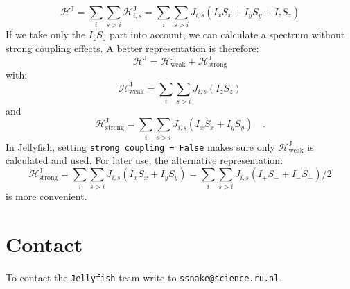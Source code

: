 \documentclass[11pt,a4paper]{article}
\begin{document}
\begin{equation}
  \mathcal{H}^\text{J} = \sum_{i}\sum_{s>i}{\mathcal{H}_{i,s}^\text{J}} = 
  \sum_{i}\sum_{s>i}{J_{i,s}(I_x S_x + I_y S_y + I_z S_z)}
\end{equation}
If we take only the $I_z S_z$ part into account, we can calculate a spectrum
without strong coupling effects. A better representation is therefore:
\begin{equation}
  \mathcal{H}^\text{J} = \mathcal{H}^\text{J}_\text{weak} +
  \mathcal{H}^\text{J}_\text{strong}
\end{equation}
with:
\begin{equation}
  \mathcal{H}^\text{J}_\text{weak} = \sum_{i}\sum_{s>i}{J_{i,s}(I_z S_z)}
\end{equation}
 and
\begin{equation}
  \mathcal{H}^\text{J}_\text{strong} = \sum_{i}\sum_{s>i}{J_{i,s}(I_x S_x + I_y
S_y)}
  \quad.
\end{equation}
In Jellyfish, setting \texttt{strong coupling = False} makes sure only
$\mathcal{H}^\text{J}_\text{weak}$ is calculated and used. 
For later use, the alternative representation:
\begin{equation}
  \mathcal{H}^\text{J}_\text{strong} = \sum_{i}\sum_{s>i}{J_{i,s}(I_x S_x + I_y
S_y)} = \sum_{i}\sum_{s>i}{J_{i,s}(I_+ S_- + I_- S_+)/2}
\end{equation}
is more convenient.
\section{Contact}
To contact the \texttt{Jellyfish} team write to \texttt{ssnake@science.ru.nl}.


\end{document}
